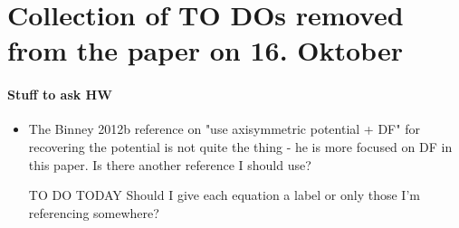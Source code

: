 \section{Collection of TO DOs removed from the paper on 16. Oktober}

\paragraph{Stuff to ask HW}
\begin{itemize}
\item The Binney 2012b reference on "use axisymmetric potential + DF" for recovering the potential is not quite the thing - he is more focused on DF in this paper. Is there another reference I should use?
\item [TO DO TODAY] Should I give each equation a label or only those I'm referencing somewhere?
\end{itemize}


